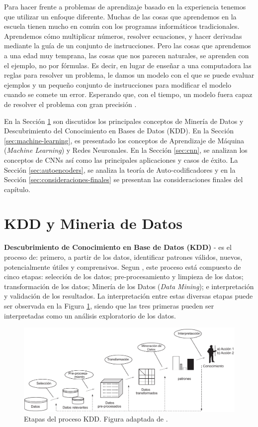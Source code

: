 Para hacer frente a  problemas de aprendizaje basado en la experiencia  tenemos  que utilizar un enfoque diferente. Muchas de las cosas que aprendemos en la escuela tienen mucho en común con los programas informáticos tradicionales. Aprendemos cómo multiplicar números, resolver ecuaciones, y hacer derivadas mediante la guía de un conjunto de instrucciones. Pero las cosas que aprendemos a una edad muy temprana, las cosas que nos parecen naturales, se aprenden con el ejemplo, no por fórmulas. Es decir,  en lugar de enseñar a una computadora las reglas para resolver un problema, le damos un modelo con el que se puede evaluar ejemplos y un pequeño conjunto de instrucciones para modificar el modelo cuando se comete un error. Esperando que, con el tiempo, un modelo fuera capaz de resolver el problema con gran precisión \cite{TheDLBook}. 
 
 En la Sección \ref{sec:kdd-datamining} son discutidos los principales conceptos de Minería de Datos y Descubrimiento del Conocimiento en Bases de Datos (KDD). En la Sección \ref{sec:machine-learning}, es  presentado los conceptos de Aprendizaje de Máquina  (\textit{Machine Learning}) y Redes Neuronales. En la Sección \ref{sec:cnn}, se analizan los conceptos de  \acf{CNNs} así como las principales  aplicaciones y casos de éxito. La Sección \ref{sec:autoencoders}, se analiza la teoría de Auto-codificadores y en la Sección \ref{sec:consideraciones-finales} se presentan las consideraciones finales del capítulo.


\section{KDD y Mineria de Datos}\label{sec:kdd-datamining}

\textbf{Descubrimiento de Conocimiento en Base de Datos (KDD)} - es el proceso de: primero, a partir de los datos, identificar patrones válidos, nuevos, potencialmente útiles y comprensivos. Segun  \cite{Fayyad:1996:DMK:257938.257942}, este proceso está compuesto de cinco etapas: selección de los datos; pre-procesamiento y limpieza de los datos; transformación de los datos; Minería de los Datos (\textit{Data Mining}); e interpretación y validación de los resultados. La interpretación entre estas diversas etapas puede ser observada en la Figura \ref{fig:processoKDD}, siendo que las tres primeras pueden ser interpretadas como un análisis exploratorio de los datos.

\begin{figure}[htp]
\centering
\includegraphics[width=0.9\columnwidth]{chapter3/KDD-process.pdf}
\caption{Etapas del proceso KDD. Figura adaptada de \cite{Fayyad:1996:DMK:257938.257942}.}
\label{fig:processoKDD}
\end{figure}


